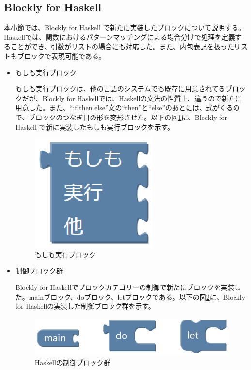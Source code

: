 \documentclass{eniepaper}
\begin{document}
   \subsection{Blockly for Haskell}
   
本小節では、Blockly for Haskell で新たに実装したブロックについて説明する。Haskellでは、関数におけるパターンマッチングによる場合分けで処理を定義することができ、引数がリストの場合にも対応した。また、内包表記を扱ったリストもブロックで表現可能である。

\begin{itemize}

\item もしも実行ブロック

もしも実行ブロックは、他の言語のシステムでも既存に用意されてるブロックだが、Blockly for Haskellでは、Haskellの文法の性質上、違うので新たに用意した。また、“if then else”文の“then”と“else”のあとには、式がくるので、ブロックのつなぎ目の形を変形させた。以下の図\ref{fig:haskell_if}に、Blockly for Haskell で新に実装したもしも実行ブロックを示す。

\begin{figure}[h]
\begin{center}
\includegraphics[scale=0.5]{img/haskell_if.eps}
\caption{もしも実行ブロック}%
\label{fig:haskell_if}
\end{center}%
\end{figure}%

\item 制御ブロック群

Blockly for Haskellでブロックカテゴリーの制御で新たにブロックを実装した。mainブロック、doブロック、letブロックである。以下の図\ref{fig:haskell_logic}に、Blockly for Haskellの実装した制御ブロック群を示す。

\begin{figure}[h]
\begin{center}
\includegraphics[scale=0.5]{img/haskell_logic.eps}
\caption{Haskellの制御ブロック群}%
\label{fig:haskell_logic}
\end{center}%
\end{figure}%


\end{itemize}
\end{document}
